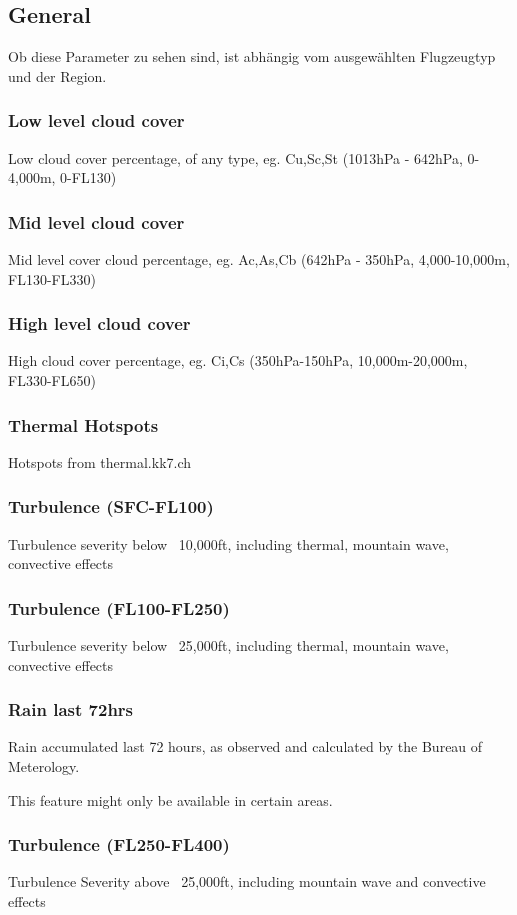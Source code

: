 \documentclass[11pt,a4paper]{article}
\begin{document}
\subsection{General}
Ob diese Parameter zu sehen sind, ist abhängig vom ausgewählten Flugzeugtyp und der Region.
\subsubsection{Low level cloud cover}
Low cloud cover percentage, of any type, eg. Cu,Sc,St (1013hPa - 642hPa, 0-4,000m, 0-FL130)
\subsubsection{Mid level cloud cover}
Mid level cover cloud percentage, eg. Ac,As,Cb (642hPa - 350hPa, 4,000-10,000m, FL130-FL330)
\subsubsection{High level cloud cover}
High cloud cover percentage, eg. Ci,Cs (350hPa-150hPa, 10,000m-20,000m, FL330-FL650)
\subsubsection{Thermal Hotspots}
Hotspots from thermal.kk7.ch
\subsubsection{Turbulence (SFC-FL100)}
Turbulence severity below ~10,000ft, including thermal, mountain wave, convective effects
\subsubsection{Turbulence (FL100-FL250)}
Turbulence severity below ~25,000ft, including thermal, mountain wave, convective effects
\subsubsection{Rain last 72hrs}
Rain accumulated last 72 hours, as observed and calculated by the Bureau of Meterology.
\begin{tip}
\item This feature might only be available in certain areas.\\
\end{tip}
\subsubsection{Turbulence (FL250-FL400)}
Turbulence Severity above ~25,000ft, including mountain wave and convective effects
\end{document}
